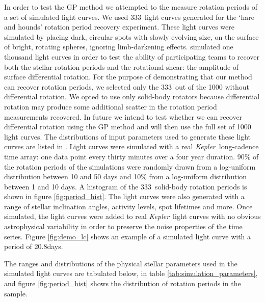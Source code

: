 \documentclass[useAMS, usenatbib, preprint, 12pt]{aastex}
\newcommand{\naigrain}{333}
\newcommand{\aigrainexampleperiod}{20.8}
\newcommand{\Kepler}{{\it Kepler}}
\newcommand{\kepler}{\Kepler}
\begin{document}
In order to test the GP method we attempted to the measure rotation periods of
a set of simulated light curves.
We used \naigrain\ light curves generated for the \citet{Aigrain2015}
`hare and hounds' rotation period recovery experiment.
These light curves were simulated by placing dark, circular spots with slowly
evolving size, on the surface of bright, rotating spheres, ignoring
limb-darkening effects.
\citet{Aigrain2015} simulated one thousand light curves in order to test the
ability of participating teams to recover both the stellar rotation periods
and the rotational shear: the amplitude of surface differential rotation.
For the purpose of demonstrating that our method can recover rotation periods,
we selected only the \naigrain\ out of the 1000 without differential
rotation.
We opted to use only solid-body rotators because differential rotation may
produce some additional scatter in the rotation period measurements recovered.
In future we intend to test whether we can recover differential rotation using
the GP method and will then use the full set of 1000 light curves.
The distributions of input parameters used to generate these light curves are
listed in \citet{Aigrain2015}.
Light curves were simulated with a real \Kepler\ long-cadence time array:
one data point every thirty minutes over a four year duration.
90\% of the rotation periods of the simulations were randomly drawn from a
log-uniform distribution between 10 and 50 days and 10\% from a log-uniform
distribution between 1 and 10 days.
A histogram of the \naigrain\ solid-body rotation periods is shown in figure
\ref{fig:period_hist}.
The light curves were also generated with a range of stellar inclination
angles, activity levels, spot lifetimes and more.
Once simulated, the light curves were added to real \kepler\ light curves with
no obvious astrophysical variability in order to preserve the noise properties
of the time series.
Figure \ref{fig:demo_lc} shows an example of a simulated light curve with a
period of \aigrainexampleperiod days.

The ranges and distributions of the physical stellar parameters used in the
simulated light curves are tabulated below, in table
\ref{tab:simulation_parameters}, and figure \ref{fig:period_hist} shows the
distribution of rotation periods in the \citet{Aigrain2015} sample.
\end{document}
